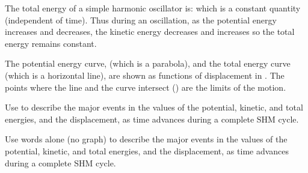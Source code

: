 {

The total energy of a simple harmonic oscillator is:
%
%
which is a constant quantity (independent of time).
Thus during an oscillation, as the potential energy increases and decreases,
the kinetic energy decreases and increases so the total energy remains constant.


The potential energy curve,  (which is a parabola), and the
total energy curve  (which is a horizontal line), are shown
as functions of displacement in .
The points where the line and the curve intersect () are the
limits of the motion.

\tryit Use  to describe the major events in the values of the potential,
kinetic, and total energies, and the displacement, as time advances
during a complete SHM cycle. 

\tryit Use words alone (no graph) to describe the major events in the values
of the potential, kinetic, and total energies, and the displacement,
as time advances during a complete SHM cycle. 
}%
%
%
